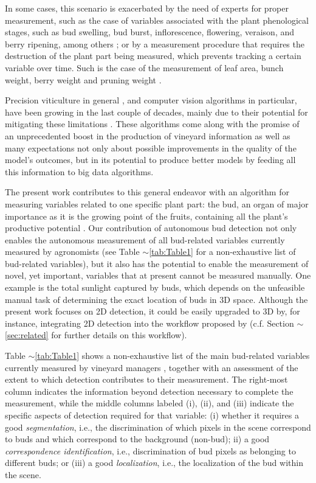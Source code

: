 \documentclass[a4paper,authoryear,review]{elsarticle}
\begin{document}
	In some cases, this scenario is exacerbated by the need of experts for proper measurement, such as the case of variables associated with the plant phenological stages, such as bud swelling, bud burst, inflorescence, flowering, veraison, and berry ripening, among others \citep{lorenz1995growth}; or by a measurement procedure that requires the destruction of the plant part being measured, which prevents tracking a certain variable over time. Such is the case of the measurement of leaf area, bunch weight, berry weight and pruning weight \citep{kliewer2005leaf}. 
	
	Precision viticulture in general \citep{bramley2009lessons}, and computer vision algorithms in particular, have been growing in the last couple of decades, mainly due to their potential for mitigating these limitations \citep{seng2018computer, matese2015technology}. These algorithms come along with the promise of an unprecedented boost in the production of vineyard information as well as many expectations not only about possible improvements in the quality of the model’s outcomes, but in its potential to produce better models by feeding all this information to big data algorithms. 
	
	The present work contributes to this general endeavor with an algorithm for measuring variables related to one specific plant part: the bud, an organ of major importance as it is the growing point of the fruits, containing all the plant’s productive potential \citep{may2000bud}. Our contribution of autonomous bud detection not only enables the autonomous measurement of all bud-related variables currently measured by agronomists (see Table $\sim$\ref{tab:Table1} for a non-exhaustive list of bud-related variables), but it also has the potential to enable the measurement of novel, yet important, variables that at present cannot be measured manually. One example is the total sunlight captured by buds, which depends on the unfeasible manual task of determining the exact location of buds in 3D space.  Although the present work focuses on 2D detection, it could be easily upgraded to 3D by, for instance, integrating 2D detection into the workflow proposed by \citet{diaz2018grapevine} (c.f. Section $\sim$\ref{sec:related} for further details on this workflow).
	
	Table $\sim$\ref{tab:Table1} shows a non-exhaustive list of the main bud-related variables currently measured by vineyard managers \citep{sanchez2005bud, noyce2016basis, collins2020effects}, together with an assessment of the extent to which detection contributes to their measurement. The right-most column indicates the information beyond detection necessary to complete the measurement, while the middle columns labeled (i), (ii), and (iii) indicate the specific aspects of detection required for that variable: (i) whether it requires a good  \emph{segmentation}, i.e., the discrimination of which pixels in the scene correspond to buds and which correspond to the background (non-bud); ii) a good \emph{correspondence identification}, i.e., discrimination of bud pixels as belonging to different buds; or (iii) a good \emph{localization}, i.e., the localization of the bud within the scene.
	
\end{document}
